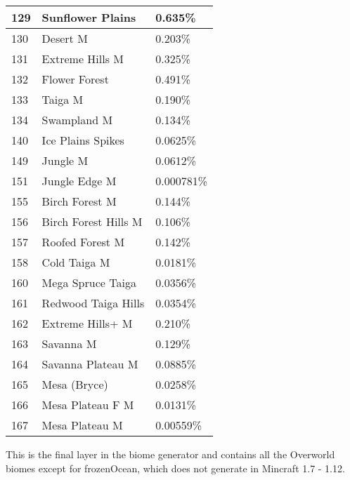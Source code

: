 \documentclass{article}
\begin{document}
	\begin{tabular}{|l|l|l|}\hline
		129    & Sunflower Plains     & 0.635\%\\\hline
		130    & Desert M             & 0.203\%\\\hline
		131    & Extreme Hills M      & 0.325\%\\\hline
		132    & Flower Forest        & 0.491\%\\\hline
		133    & Taiga M              & 0.190\%\\\hline
		134    & Swampland M          & 0.134\%\\\hline
		140    & Ice Plains Spikes    & 0.0625\%\\\hline
		149    & Jungle M             & 0.0612\%\\\hline
		151    & Jungle Edge M        & 0.000781\%\\\hline
		155    & Birch Forest M       & 0.144\%\\\hline
		156    & Birch Forest Hills M & 0.106\%\\\hline
		157    & Roofed Forest M      & 0.142\%\\\hline
		158    & Cold Taiga M         & 0.0181\%\\\hline
		160    & Mega Spruce Taiga    & 0.0356\%\\\hline
		161    & Redwood Taiga Hills  & 0.0354\%\\\hline
		162    & Extreme Hills+ M     & 0.210\%\\\hline
		163    & Savanna M            & 0.129\%\\\hline
		164    & Savanna Plateau M    & 0.0885\%\\\hline
		165    & Mesa (Bryce)         & 0.0258\%\\\hline
		166    & Mesa Plateau F M     & 0.0131\%\\\hline
		167    & Mesa Plateau M       & 0.00559\%\\\hline
	\end{tabular}
	
	\medskip\noindent
	This is the final layer in the biome generator and contains all the Overworld biomes except for frozenOcean, which does not generate in Mincraft 1.7 - 1.12.
	
\end{document}
